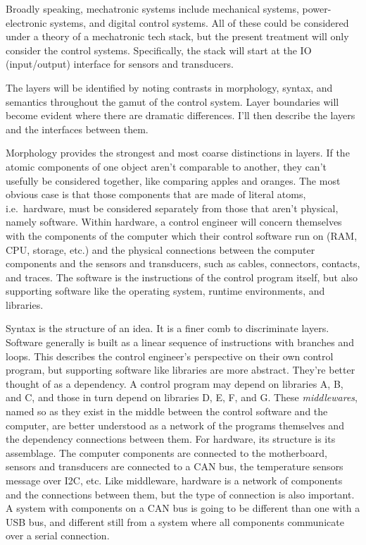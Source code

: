 \documentclass[english,12pt,a4paper,pdftex,eng,utf8]{aaltothesis}
\begin{document}
Broadly speaking, mechatronic systems include mechanical systems, power-electronic systems, and digital control systems. All of these could be considered under a theory of a mechatronic tech stack, but the present treatment will only consider the control systems. Specifically, the stack will start at the IO (input/output) interface for sensors and transducers.

The layers will be identified by noting contrasts in morphology, syntax, and semantics throughout the gamut of the control system. Layer boundaries will become evident where there are dramatic differences. I'll then describe the layers and the interfaces between them.

Morphology provides the strongest and most coarse distinctions in layers. If the atomic components of one object aren't comparable to another, they can't usefully be considered together, like comparing apples and oranges. The most obvious case is that those components that are made of literal atoms, i.e.\ hardware, must be considered separately from those that aren't physical, namely software. Within hardware, a control engineer will concern themselves with the components of the computer which their control software run on (RAM, CPU, storage, etc.) and the physical connections between the computer components and the sensors and transducers, such as cables, connectors, contacts, and traces. The software is the instructions of the control program itself, but also supporting software like the operating system, runtime environments, and libraries.

Syntax is the structure of an idea. It is a finer comb to discriminate layers. Software generally is built as a linear sequence of instructions with branches and loops. This describes the control engineer's perspective on their own control program, but supporting software like libraries are more abstract. They're better thought of as a dependency. A control program may depend on libraries A, B, and C, and those in turn depend on libraries D, E, F, and G. These \textit{middlewares}, named so as they exist in the middle between the control software and the computer, are better understood as a network of the programs themselves and the dependency connections between them. For hardware, its structure is its assemblage. The computer components are connected to the motherboard, sensors and transducers are connected to a CAN bus, the temperature sensors message over I2C, etc. Like middleware, hardware is a network of components and the connections between them, but the type of connection is also important. A system with components on a CAN bus is going to be different than one with a USB bus, and different still from a system where all components communicate over a serial connection.
\end{document}
